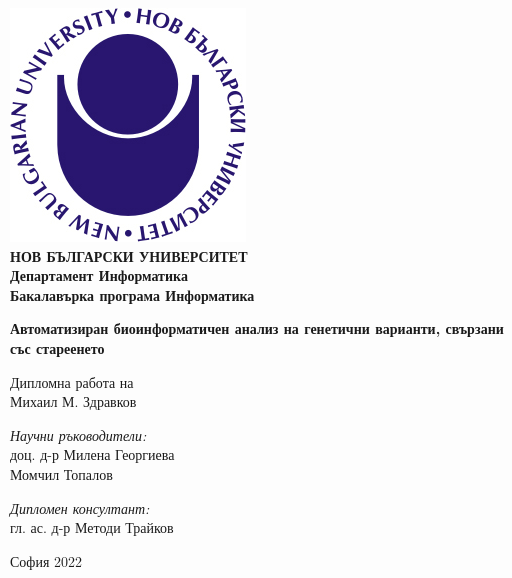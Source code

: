 \documentclass[pdftex,cyrillic,14pt,a4page,twoside,openright]{extreport}
\begin{document}
\begin{titlepage}
	\begin{center}
	\includegraphics[scale=1.2]{./NBU_logo.jpg}\\[0.3cm]
    \textbf{\Large НОВ БЪЛГАРСКИ УНИВЕРСИТЕТ\\[0.4cm]}
    \textbf{\Large Департамент Информатика\\[0.4cm]}
    \textbf{\Large Бакалавърка програма Информатика\\[3cm]}
   
		\textbf{\LARGE Автоматизиран биоинформатичен анализ на генетични варианти, свързани със стареенето\\[2cm]}
		\begin{Large}
		Дипломна работа на\\[0.2cm]
		Михаил М. Здравков\\[3cm]
		\end{Large}
		\begin{minipage}{0.48\textwidth}
			\begin{flushleft} \large
				\emph{Научни ръководители:} \\
				доц. д-р Милена Георгиева \\
				Момчил Топалов
			\end{flushleft}
		\end{minipage}
			\begin{minipage}{0.48\textwidth}
			\begin{flushright} \large
				\emph{Дипломен консултант:} \\
				гл. ас. д-р Методи Трайков\\
				\clearpage
			\end{flushright}
		\end{minipage}

		\vfill

		{\large София 2022}

	\end{center}
\end{titlepage}
\end{document}
